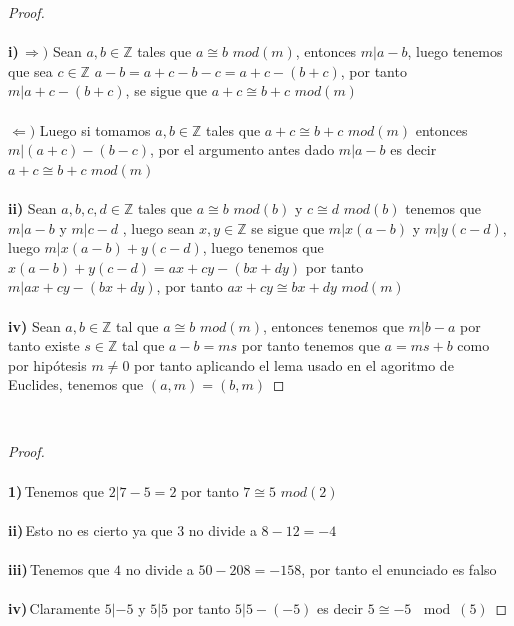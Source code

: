 \documentclass[11pt,letterpaper]{article}
\newcommand{\Z}{\mathbb{Z}}
\begin{document}
\begin{proof}\,\\
    \,\\
    \textbf{i)}\,$\Rightarrow)$ Sean $a,b\in \Z$ tales que $a \cong b\,\,mod(m)$, entonces $m|a-b$, luego tenemos que sea $c\in \Z$ $a-b=a+c-b-c=a+c-(b+c)$, por tanto $m|a+c-(b+c)$, se sigue que
    $a+c \cong b+c\,\,mod(m)$\,\\
    \,\\ 
    $\Leftarrow)$ Luego si tomamos $a,b\in \Z$ tales que $a+c \cong b+c\,\,mod(m)$ entonces $m|(a+c)-(b-c)$, por el argumento antes dado
    $m|a-b$ es decir $a+c \cong b+c\,\,mod(m)$\,\\
    \,\\
    \textbf{ii)} Sean $a,b,c,d\in \Z$ tales que $a\cong b\,\,mod(b)$ y $c\cong d\,\,mod(b)$ tenemos que
    $m|a-b$ y $m|c-d$ , luego sean $x,y\in \Z$ se sigue que $m|x(a-b)$ y $m|y(c-d)$, luego $m|x(a-b)+y(c-d)$, luego tenemos que
    $x(a-b)+y(c-d)=ax+cy-(bx+dy)$ por tanto $m|ax+cy-(bx+dy)$, por tanto $ax+cy\cong bx+dy\,\,mod(m)$\,\\
    \,\\
    \textbf{iv)}  Sean $a,b\in \Z$ tal que $a\cong b\,\,mod(m)$, entonces tenemos que $m|b-a$ por tanto existe $s\in \Z$ tal que $a-b=ms$ por tanto tenemos que 
    $a=ms+b$ como por hip\'otesis $m\neq 0$ por tanto aplicando el lema usado en el agoritmo de Euclides, tenemos que $(a,m)=(b,m)$

    
\end{proof}
\,\\
\begin{proof}\,\\
    \,\\
    \textbf{1)}\,Tenemos que $2|7-5=2$ por tanto $7\cong 5\,\,mod(2)$\,\\
    \,\\
    \textbf{ii)}\,Esto no es cierto ya que $3$ no divide a $8-12=-4$\,\\
    \,\\
    \textbf{iii)}\,Tenemos que $4$ no divide a $50-208=-158$, por tanto el enunciado es falso\,\\
    \,\\
    \textbf{iv)}\,Claramente $5|-5$ y $5|5$ por tanto $5|5-(-5)$ es decir
    $5\cong -5\,\mod(5)$
\end{proof}
\end{document}

